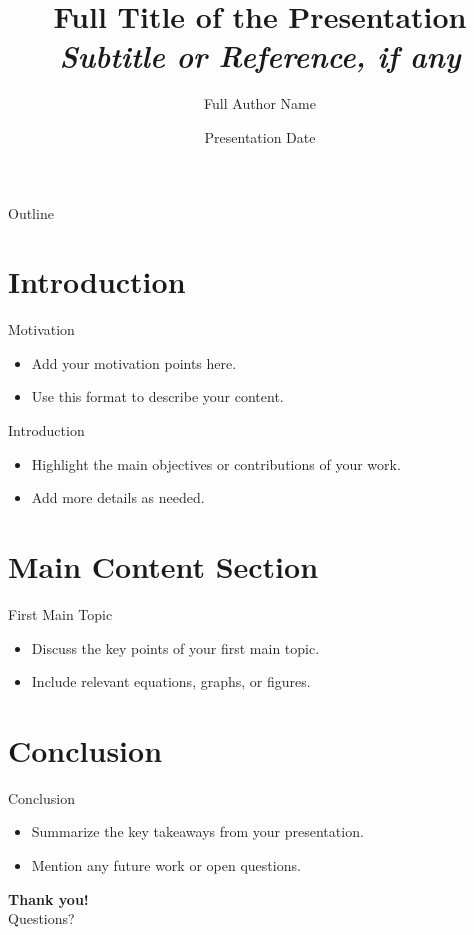\documentclass [xcolor=svgnames] {beamer}
\title[Short Title]{Full Title of the Presentation \\ \textit{Subtitle or Reference, if any}}
\author[Short Author Name]{Full Author Name}
\institute[Short Institute Name]{Full Institute Name}
\date{Presentation Date}
\begin{document}
\begin{frame}
    \titlepage
\end{frame}

\begin{frame}{Outline}
    \tableofcontents
\end{frame}

\section{Introduction}
\begin{frame}{Motivation}
    \begin{itemize}
        \item Add your motivation points here.
        \item Use this format to describe your content.
    \end{itemize}
\end{frame}

\begin{frame}{Introduction}
    \begin{itemize}
        \item Highlight the main objectives or contributions of your work.
        \item Add more details as needed.
    \end{itemize}
\end{frame}

\section{Main Content Section}
\begin{frame}{First Main Topic}
    \begin{itemize}
        \item Discuss the key points of your first main topic.
        \item Include relevant equations, graphs, or figures.
    \end{itemize}
\end{frame}


\section{Conclusion}
\begin{frame}{Conclusion}
    \begin{itemize}
        \item Summarize the key takeaways from your presentation.
        \item Mention any future work or open questions.
    \end{itemize}
\end{frame}

\begin{frame}
    \centering
    \textbf{Thank you!}\\
    Questions?
\end{frame}
\end{document}
